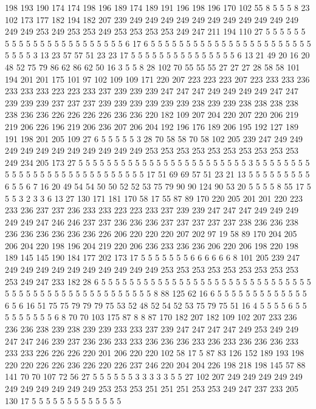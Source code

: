 198 193 190 174 174 198 196 189 174 189 191 196 198 196 170 102 55 8 5 5
5 8 23 102 173 177 182 194 182 207 239 249 249 249 249 249 249 249 249 249
249 249 249 249 253 249 253 253 249 253 253 253 253 249 247 211 194 110 27 5
5 5 5 5 5 5 5 5 5 5 5 5 5 5 5 5 5 5 5 5
5 5 6 17 6 5 5 5 5 5 5 5 5 5 5 5 5 5 5 5
5 5 5 5 5 5 5 5 5 5 5 5 3 13 23 57 57 51 23 23
17 5 5 5 5 5 5 5 5 5 5 5 5 5 5 5 6 13 21 49
20 16 20 48 52 75 79 86 62 86 62 50 16 3 5 5 8 28 102 70
55 55 55 27 27 27 28 58 58 101 194 201 201 175 101 97 102 109 109 171
220 207 223 223 223 207 223 233 233 236 233 233 233 223 223 233 237 239 239 239
247 247 247 249 249 249 249 247 247 239 239 239 237 237 237 239 239 239 239 239
239 238 239 239 238 238 238 238 238 236 236 226 226 226 226 236 236 220 182 109
207 204 220 207 220 206 219 219 206 226 196 219 206 236 207 206 204 192 196 176
189 206 195 192 127 189 191 198 201 205 109 27 6 5 5 5 5 5 3 28
70 58 58 70 58 102 205 239 247 249 249 249 249 249 249 249 249 249 249 249
253 253 253 253 253 253 253 253 253 253 249 234 205 173 27 5 5 5 5 5
5 5 5 5 5 5 5 5 5 5 5 5 5 5 5 5 5 5 5 3
5 5 5 5 5 5 5 5 5 5 5 5 5 5 5 5 5 5 5 5
5 5 5 5 5 5 5 5 17 51 69 69 57 51 23 21 13 5 5 5
5 5 5 5 5 5 6 5 5 6 7 16 20 49 54 54 50 50 52 52
53 75 79 90 90 124 90 53 20 5 5 5 5 8 55 17 5 5 5 3
2 3 3 6 13 27 130 171 181 170 58 17 55 87 89 170 220 205 201 201
220 223 233 236 237 237 236 233 233 223 223 233 237 239 239 247 247 247 249 249
249 249 249 247 246 246 237 237 236 236 236 237 237 237 237 237 238 236 236 238
236 236 236 236 236 236 226 206 220 220 220 207 202 97 19 58 89 170 204 205
206 204 220 198 196 204 219 220 206 236 233 236 236 206 220 206 198 220 198 189
145 145 190 184 177 202 173 17 5 5 5 5 5 5 5 6 6 6 6 6
6 8 101 205 239 247 249 249 249 249 249 249 249 249 249 249 253 253 253 253
253 253 253 253 253 253 249 247 233 182 28 6 5 5 5 5 5 5 5 5
5 5 5 5 5 5 5 5 5 5 5 5 5 5 5 5 5 5 5 5
5 5 5 5 5 5 5 5 5 5 5 5 5 5 5 5 5 5 5 5
5 5 5 8 88 125 62 16 6 5 5 5 5 5 5 5 5 5 5 5
5 5 6 5 6 16 51 75 75 79 79 79 75 53 52 48 52 54 52 53
75 79 75 51 16 4 5 5 5 5 6 5 5 5 5 5 5 5 5 5
6 8 70 70 103 175 87 8 8 87 170 182 207 182 109 102 207 233 236 236
236 238 239 238 239 239 233 233 237 239 247 247 247 247 249 253 249 249 247 247
246 239 237 236 236 233 233 236 236 236 233 236 233 236 236 236 233 233 233 226
226 226 220 201 206 220 220 102 58 17 5 87 83 126 152 189 193 198 220 220
226 226 236 226 220 226 237 246 220 204 204 226 198 218 198 145 57 88 141 70
70 107 72 56 27 5 5 5 5 5 5 3 3 3 3 3 5 5 27 102
207 249 249 249 249 249 249 249 249 249 249 249 253 253 253 251 251 251 253 253
249 247 237 233 205 130 17 5 5 5 5 5 5 5 5 5 5 5 5 5
